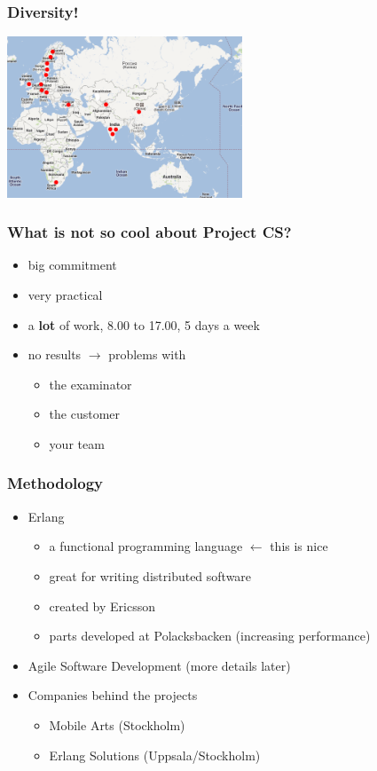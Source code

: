 \documentclass{beamer}
\begin{document}
\begin{frame}
  \frametitle{Diversity!}
  \begin{center}
   \includegraphics[width=7cm]{images/map.png}
  \end{center}
\end{frame}

\begin{frame}
  \frametitle{What is not so cool about Project CS?}
  \begin{itemize}
    \item big commitment \pause
    \item very practical \pause
    \item a {\bf lot} of work, 8.00 to 17.00, 5 days a week \pause
      \item no results $\rightarrow$ problems with
        \begin{itemize}
          \item the examinator \pause
          \item the customer \pause
          \item your team \pause
        \end{itemize}
  \end{itemize}
\end{frame}

\begin{frame}
  \frametitle{Methodology}
  \begin{itemize}
    \item Erlang
      \begin{itemize}
        \item a functional programming language \pause $\leftarrow$ this is nice \pause
        \item great for writing distributed software \pause
        \item created by Ericsson \pause
        \item parts developed at Polacksbacken (increasing performance) \pause
      \end{itemize}
    \item Agile Software Development (more details later) \pause
    \item Companies behind the projects
    \begin{itemize}
      \item Mobile Arts (Stockholm)
      \item Erlang Solutions (Uppsala/Stockholm)
    \end{itemize}
  \end{itemize}
\end{frame}
\end{document}
